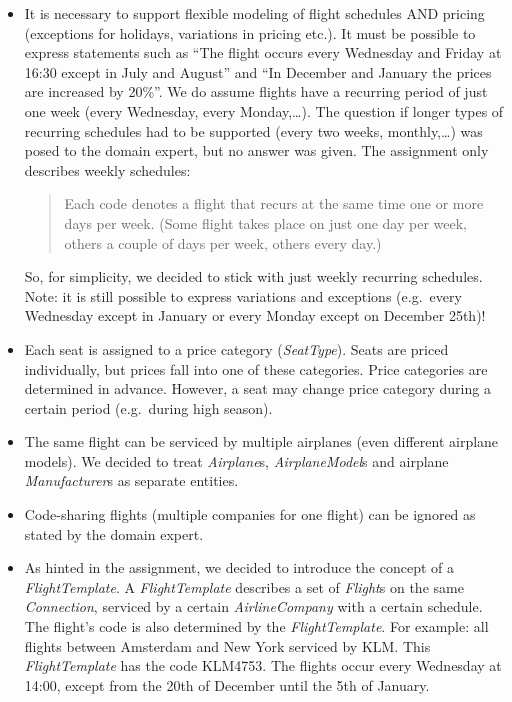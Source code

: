 \documentclass[a4paper]{article}
\newcommand{\field}[1]{\emph{#1}}
\begin{document}
\begin{itemize}

\item It is necessary to support flexible modeling of flight schedules AND pricing (exceptions for holidays, variations in pricing etc.).
It must be possible to express statements such as ``The flight occurs every Wednesday and Friday at 16:30 except in July and August'' and ``In December and January the prices are increased by 20\%''.
We do assume flights have a recurring period of just one week (every Wednesday, every Monday,\dots).
The question if longer types of recurring schedules had to be supported (every two weeks, monthly,\dots) was posed to the domain expert, but no answer was given.
The assignment only describes weekly schedules:

\begin{quote}
Each code denotes a flight that recurs at the same time one or more days per week.
(Some flight takes place on just one day per week, others a couple of days per week, others every day.)
\end{quote}

So, for simplicity,  we decided to stick with just weekly recurring schedules.
Note: it is still possible to express variations and exceptions (e.g.\ every Wednesday except in January or every Monday except on December 25th)! \\

\item Each seat is assigned to a price category (\field{SeatType}).
Seats are priced individually, but prices fall into one of these categories.
Price categories are determined in advance.
However, a seat may change price category during a certain period (e.g.\ during high season).

\item The same flight can be serviced by multiple airplanes (even different airplane models).
We decided to treat \field{Airplane}s, \field{AirplaneModel}s and airplane \field{Manufacturer}s as separate entities.\\

\item Code-sharing flights (multiple companies for one flight) can be ignored as stated by the domain expert.\\

\item As hinted in the assignment, we decided to introduce the concept of a \field{FlightTemplate}.
A \field{FlightTemplate} describes a set of \field{Flight}s on the same \field{Connection}, serviced by a certain \field{AirlineCompany} with a certain schedule.
The flight's code is also determined by the \field{FlightTemplate}.
For example: all flights between Amsterdam and New York serviced by KLM. This \field{FlightTemplate} has the code KLM4753.
The flights occur every Wednesday at 14:00, except from the 20th of December until the 5th of January.



\end{itemize}
\end{document}
